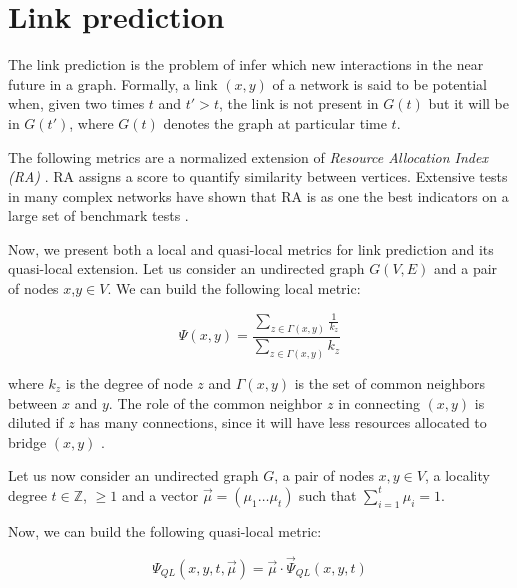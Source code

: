 \section{Link prediction}
\label{sec:link-prediction}

The link prediction is the problem of infer which new interactions in the near future in a graph. Formally, a link $(x,y)$ of a network is said to be potential when, given two times $t$ and $t'>t$, the link is not present in $G(t)$ but it will be in $G(t')$, where $G(t)$ denotes the graph at particular time $t$. 

The following metrics are a normalized extension of \textit{Resource Allocation Index (RA)} \cite{berlusconi2016link, Lu2011,zhou2009predicting}. RA assigns a score to quantify similarity between vertices. Extensive tests in many complex networks have shown that RA is as one the best indicators on a large set of benchmark tests  \cite{berlusconi2016link,Lu2011}.

Now, we present both a local and quasi-local metrics for link prediction and its quasi-local extension.
Let us consider an undirected graph $G(V,E)$ and a pair of nodes $x$,$y\in V$. We can build the following local metric:

\begin{equation}
\label{eqn:prediction-local}
\Psi(x,y)=
\frac{\sum\limits_{z\in\Gamma(x,y)}\frac{1}{k_{z}}}
{\sum\limits_{z\in\Gamma(x,y)}k_{z}}
\end{equation}

where $k_{z}$ is the degree of node $z$ and $\Gamma(x,y)$ is the set of common neighbors between $x$ and $y$. The role of the common neighbor $z$ in connecting $(x, y)$ is diluted if $z$ has many connections, since it will have less resources allocated to bridge $(x, y)$ \cite{berlusconi2016link}.

Let us now consider an undirected graph $G$, a pair of nodes $x,y\in V$, a locality degree $t\in \mathbb{Z}$, $\geq 1$ and a vector $\vec{\mu}=(\mu_{1}\ldots\mu_{t})$ such that $\sum_{i=1}^{t}\mu_{i}=1$. 

Now, we can build the following quasi-local metric:

\begin{equation}
\label{eqn:prediction-quasi-local-1}
\Psi_{QL}(x,y,t,\vec{\mu})=\vec{\mu}\cdot\vec{\Psi}_{QL}(x,y,t)
\end{equation}

